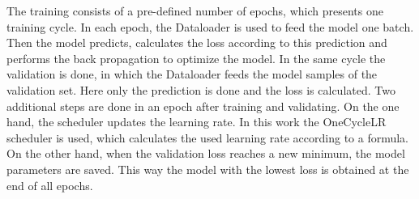 The training consists of a pre-defined number of epochs, which presents one training cycle.
In each epoch, the Dataloader is used to feed the model one batch.
Then the model predicts, calculates the loss according to this prediction and performs the back propagation to optimize the model.
In the same cycle the validation is done, in which the Dataloader feeds the model samples of the validation set.
Here only the prediction is done and the loss is calculated.
Two additional steps are done in an epoch after training and validating.
On the one hand, the scheduler updates the learning rate.
In this work the OneCycleLR scheduler \cite{pytorch_oneCycleLR_docu} is used, which calculates the used learning rate according to a formula.
On the other hand, when the validation loss reaches a new minimum, the model parameters are saved.
This way the model with the lowest loss is obtained at the end of all epochs.
